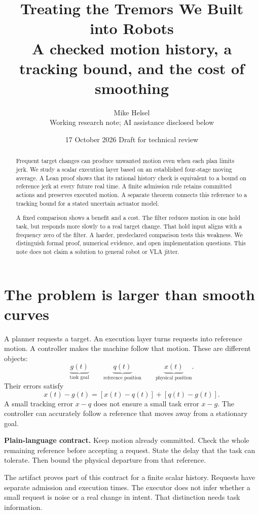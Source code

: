 \documentclass[11pt,letterpaper]{article}
\title{\vspace{-1.5em}\textbf{Treating the Tremors We Built into Robots}\\[.4em]
\large A checked motion history, a tracking bound, and the cost of smoothing}
\author{Mike Helsel\\[-.2em]\small Working research note; AI assistance disclosed below}
\date{17 October 2026 \quad Draft for technical review}
\begin{document}
\maketitle
\vspace{-1em}
\begin{abstract}
Frequent target changes can produce unwanted motion even when each plan limits jerk. We study a scalar execution layer based on an established four-stage moving average. A Lean proof shows that its rational history check is equivalent to a bound on reference jerk at every future real time. A finite admission rule retains committed actions and preserves executed motion. A separate theorem connects this reference to a tracking bound for a stated uncertain actuator model.

A fixed comparison shows a benefit and a cost. The filter reduces motion in one hold task, but responds more slowly to a real target change. That hold input aligns with a frequency zero of the filter. A harder, predeclared comparison tests this weakness. We distinguish formal proof, numerical evidence, and open implementation questions. This note does not claim a solution to general robot or VLA jitter.
\end{abstract}
\section{The problem is larger than smooth curves}
A planner requests a target. An execution layer turns requests into reference motion. A controller makes the machine follow that motion. These are different objects:
\[
\underbrace{g(t)}_{\text{task goal}}\qquad
\underbrace{q(t)}_{\text{reference position}}\qquad
\underbrace{x(t)}_{\text{physical position}}.
\]
Their errors satisfy
\begin{equation}\label{split}
x(t)-g(t)=[x(t)-q(t)]+[q(t)-g(t)].
\end{equation}
A small tracking error $x-q$ does not ensure a small task error $x-g$. The controller can accurately follow a reference that moves away from a stationary goal.

\textbf{Plain-language contract.} Keep motion already committed. Check the whole remaining reference before accepting a request. State the delay that the task can tolerate. Then bound the physical departure from that reference.

The artifact proves part of this contract for a finite scalar history. Requests have separate admission and execution times. The executor does not infer whether a small request is noise or a real change in intent. That distinction needs task information.
\end{document}
